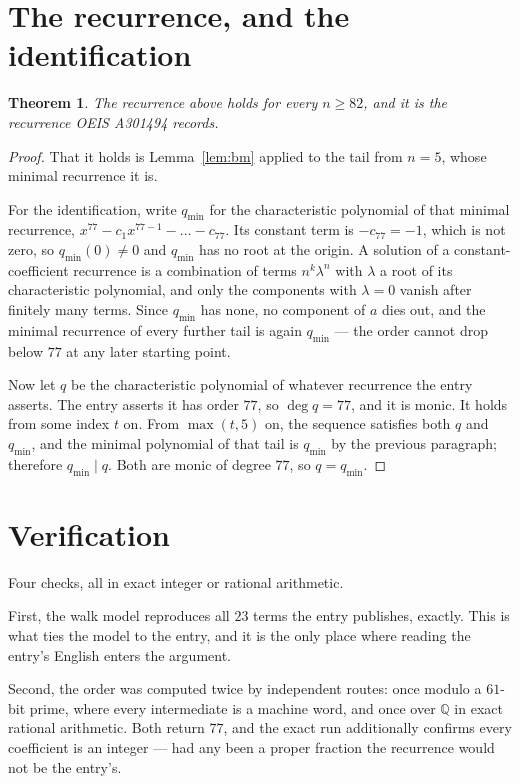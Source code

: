 \documentclass[11pt,a4paper]{article}
\theoremstyle{plain}
\newtheorem{theorem}{Theorem}
\theoremstyle{definition}
\begin{document}
\section{The recurrence, and the identification}

\begin{theorem}
The recurrence above holds for every $n\ge82$, and it is the recurrence OEIS A301494 records.
\end{theorem}

\begin{proof}
That it holds is Lemma~\ref{lem:bm} applied to the tail from $n=5$, whose minimal
recurrence it is.

For the identification, write $q_{\min}$ for the characteristic polynomial of that minimal
recurrence, $x^{77}-c_1x^{77-1}-\dots-c_{77}$. Its constant term is
$-c_{77}=-1$, which is not zero, so $q_{\min}(0)\neq0$ and $q_{\min}$ has no
root at the origin. A solution of a constant-coefficient recurrence is a combination of terms
$n^{k}\lambda^{n}$ with $\lambda$ a root of its characteristic polynomial, and only the
components with $\lambda=0$ vanish after finitely many terms. Since $q_{\min}$ has none, no
component of $a$ dies out, and the minimal recurrence of every further tail is again
$q_{\min}$ --- the order cannot drop below $77$ at any later starting point.

Now let $q$ be the characteristic polynomial of whatever recurrence the entry asserts. The
entry asserts it has order $77$, so $\deg q=77$, and it is monic. It holds from some
index $t$ on. From $\max(t,5)$ on, the sequence satisfies both $q$ and $q_{\min}$, and
the minimal polynomial of that tail is $q_{\min}$ by the previous paragraph; therefore
$q_{\min}\mid q$. Both are monic of degree $77$, so $q=q_{\min}$.
\end{proof}

\section{Verification}

Four checks, all in exact integer or rational arithmetic.

First, the walk model reproduces all $23$ terms the entry publishes, exactly. This is
what ties the model to the entry, and it is the only place where reading the entry's English
enters the argument.

Second, the order was computed twice by independent routes: once modulo a $61$-bit prime, where
every intermediate is a machine word, and once over $\mathbb{Q}$ in exact rational arithmetic.
Both return $77$, and the exact run additionally confirms every coefficient is an integer
--- had any been a proper fraction the recurrence would not be the entry's.
\end{document}
